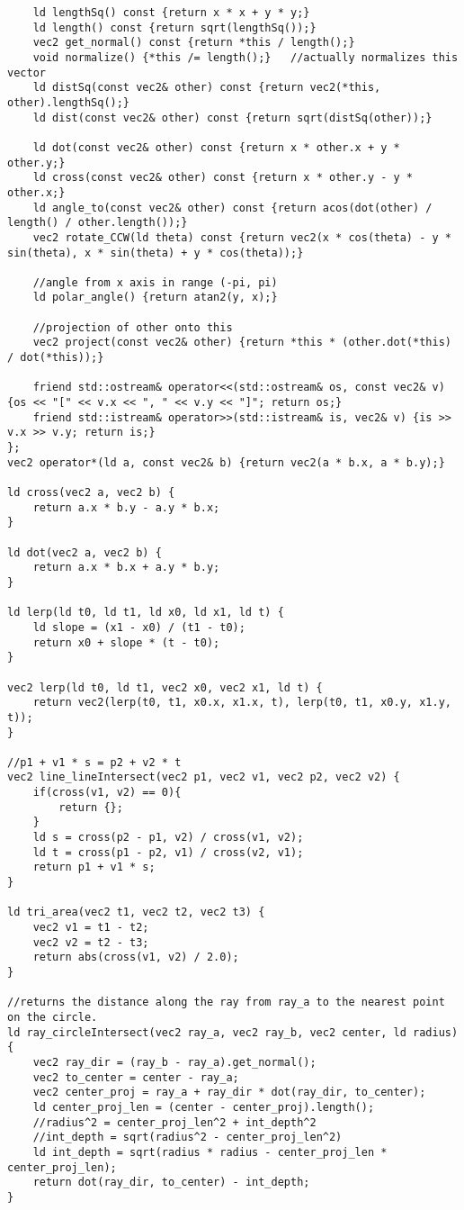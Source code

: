 \documentclass[8pt, headheight=10pt, a4paper]{article}
\begin{document}
\begin{multicols*}{3}
\begin{lstlisting}
    ld lengthSq() const {return x * x + y * y;}
    ld length() const {return sqrt(lengthSq());}
    vec2 get_normal() const {return *this / length();}
    void normalize() {*this /= length();}   //actually normalizes this vector
    ld distSq(const vec2& other) const {return vec2(*this, other).lengthSq();}
    ld dist(const vec2& other) const {return sqrt(distSq(other));}

    ld dot(const vec2& other) const {return x * other.x + y * other.y;}
    ld cross(const vec2& other) const {return x * other.y - y * other.x;}
    ld angle_to(const vec2& other) const {return acos(dot(other) / length() / other.length());}
    vec2 rotate_CCW(ld theta) const {return vec2(x * cos(theta) - y * sin(theta), x * sin(theta) + y * cos(theta));}

    //angle from x axis in range (-pi, pi)
    ld polar_angle() {return atan2(y, x);}  

    //projection of other onto this
    vec2 project(const vec2& other) {return *this * (other.dot(*this) / dot(*this));}

    friend std::ostream& operator<<(std::ostream& os, const vec2& v) {os << "[" << v.x << ", " << v.y << "]"; return os;}
    friend std::istream& operator>>(std::istream& is, vec2& v) {is >> v.x >> v.y; return is;}
};
vec2 operator*(ld a, const vec2& b) {return vec2(a * b.x, a * b.y);}

ld cross(vec2 a, vec2 b) {
    return a.x * b.y - a.y * b.x;
}

ld dot(vec2 a, vec2 b) {
    return a.x * b.x + a.y * b.y;
}

ld lerp(ld t0, ld t1, ld x0, ld x1, ld t) {
    ld slope = (x1 - x0) / (t1 - t0);
    return x0 + slope * (t - t0);
}

vec2 lerp(ld t0, ld t1, vec2 x0, vec2 x1, ld t) {
    return vec2(lerp(t0, t1, x0.x, x1.x, t), lerp(t0, t1, x0.y, x1.y, t));
}

//p1 + v1 * s = p2 + v2 * t
vec2 line_lineIntersect(vec2 p1, vec2 v1, vec2 p2, vec2 v2) {
    if(cross(v1, v2) == 0){
        return {};
    }
    ld s = cross(p2 - p1, v2) / cross(v1, v2);
    ld t = cross(p1 - p2, v1) / cross(v2, v1);
    return p1 + v1 * s;
}

ld tri_area(vec2 t1, vec2 t2, vec2 t3) {
    vec2 v1 = t1 - t2;
    vec2 v2 = t2 - t3;
    return abs(cross(v1, v2) / 2.0);
}

//returns the distance along the ray from ray_a to the nearest point on the circle. 
ld ray_circleIntersect(vec2 ray_a, vec2 ray_b, vec2 center, ld radius) {
    vec2 ray_dir = (ray_b - ray_a).get_normal();
    vec2 to_center = center - ray_a;
    vec2 center_proj = ray_a + ray_dir * dot(ray_dir, to_center);
    ld center_proj_len = (center - center_proj).length();
    //radius^2 = center_proj_len^2 + int_depth^2
    //int_depth = sqrt(radius^2 - center_proj_len^2)
    ld int_depth = sqrt(radius * radius - center_proj_len * center_proj_len);
    return dot(ray_dir, to_center) - int_depth;
}


\end{lstlisting}
\end{multicols*}
\end{document}
